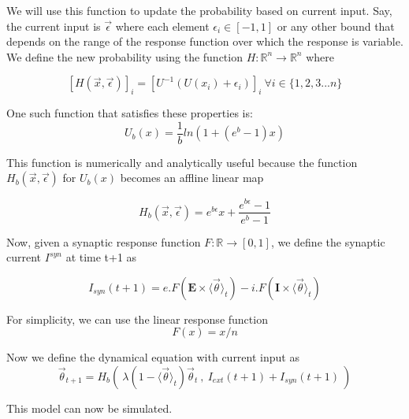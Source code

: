 \documentclass[a4paper,12pt]{article}
\begin{document}
We will use this function to update the probability based on current input. Say, the current input is $\vec{\epsilon}$ where each element $\epsilon_i \in [-1,1]$ or any other bound that depends on the range of the response function over which the response is variable. We define the new probability using the function $H:\mathbb{R}^n\rightarrow\mathbb{R}^n$ where

$$[H(\vec{x},\vec{\epsilon})]_i= [U^{-1}(U(x_i)+\epsilon_i)]_i\ \forall i\in \{1,2,3...n\}$$

One such function that satisfies these properties is:
$$U_b(x)= \frac{1}{b}ln(1+(e^b-1)x)$$

This function is numerically and analytically useful because the function $H_b(\vec{x},\vec{\epsilon})$ for $U_b(x)$ becomes an affline linear map

$$H_b(\vec{x},\vec{\epsilon}) = e^{b\epsilon}x + \frac{e^{b\epsilon}-1}{e^b-1}$$

Now, given a synaptic response function $F:\mathbb{R}\rightarrow[0,1]$, we define the synaptic current $I^{syn}$ at time t+1 as

$$I_{syn}(t+1) = e.F(\mathbf{E}\times \langle\vec{\theta}\rangle_{t}) - i.F(\mathbf{I}\times \langle\vec{\theta}\rangle_{t})$$ 

For simplicity, we can use the linear response function
$$F(x)=x/n$$

Now we define the dynamical equation with current input as 
$$\vec{\theta}_{t+1} = H_b(\ \lambda (1-\langle\vec{\theta}\rangle_t) \vec{\theta}_t\ ,\ I_{ext}(t+1) + I_{syn}(t+1)\ )$$

This model can now be simulated.
\end{document}
